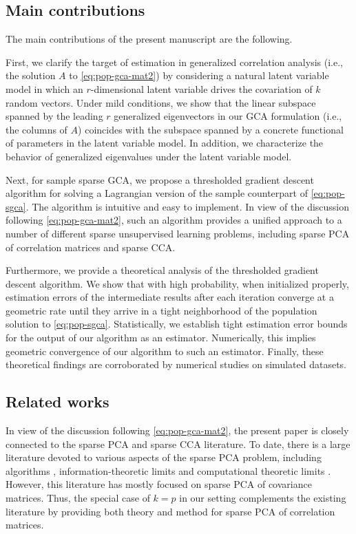 \documentclass[11pt]{article}
\newcommand{\0}{{\mathbf{0}}}
\begin{document}
\subsection{Main contributions}

The main contributions of the present manuscript are the following.


First, we clarify the target of estimation in generalized correlation analysis (i.e., the solution $A$ to \eqref{eq:pop-gca-mat2}) by considering a natural latent variable model in which an $r$-dimensional latent variable drives the covariation of $k$ random vectors.
Under mild conditions,
we show that the linear subspace spanned by the leading $r$ generalized eigenvectors in our GCA formulation (i.e., the columns of $A$) coincides with the subspace spanned by a concrete functional of parameters in the latent variable model.
In addition, we characterize the behavior of generalized eigenvalues under the latent variable model.




Next, for sample sparse GCA, we propose a thresholded gradient descent algorithm for solving a Lagrangian version of the sample counterpart of \eqref{eq:pop-sgca}. 
The algorithm is intuitive and easy to implement. 
In view of the discussion following \eqref{eq:pop-gca-mat2}, such an algorithm provides a unified approach to a number of different sparse unsupervised learning problems, including sparse PCA of correlation matrices and sparse CCA.

Furthermore, we provide a theoretical analysis of the thresholded gradient descent algorithm. 
We show that with high probability, when initialized properly, estimation errors of the intermediate results after each iteration converge at a geometric rate until they arrive in a tight neighborhood of the population solution to \eqref{eq:pop-sgca}. 
Statistically, we establish tight estimation error bounds for the output of our algorithm as an estimator.
Numerically, this implies geometric convergence of our algorithm to such an estimator.
Finally, these theoretical findings are corroborated by numerical studies on simulated datasets. 

 


\subsection{Related works} 

In view of the discussion following \eqref{eq:pop-gca-mat2}, the present paper is closely connected to the sparse PCA and sparse CCA literature.
To date, there is a large literature devoted to various aspects of the sparse PCA problem, including algorithms \citep{Zou06,JohnstoneLu09,Amini09,Witten09,ma2013sparse,yuan2013truncated,vu2013fantope,wang2014tighten}, information-theoretic limits \citep{Birnbaum12,cai2013sparse,Vu12sp} and computational theoretic limits \citep{Berthet13,gao2017sparse}. 
However, this literature has mostly focused on sparse PCA of covariance matrices. 
Thus, the special case of $k = p$ in our setting complements the existing literature by providing both theory and method for sparse PCA of correlation matrices.
\end{document}
